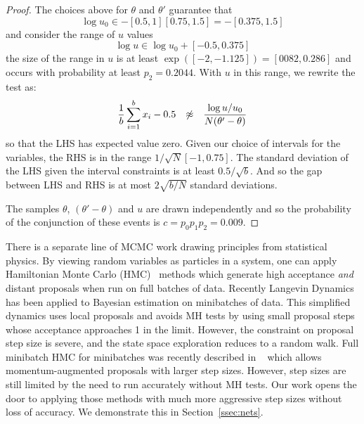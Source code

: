 \documentclass{article}
\begin{document}
\begin{proof}
 The choices above for $\theta$ and $\theta'$ guarantee that
  \begin{equation}
    \log u_0 \in -[0.5,1][0.75,1.5] = -[0.375,1.5]
        \end{equation}
and consider the range of $u$ values
  \begin{equation}
    \log u \in \log u_0 + [-0.5,0.375]
  \end{equation}
  the size of the range in $u$ is at least $\exp([-2,-1.125]) = [0082,0.286]$ and occurs
  with probability at least $p_2=0.2044$. With $u$ in this range, we rewrite the test as:
  \begin{equation}
    \frac{1}{b}\sum_{i=1}^b x_i-0.5 \hspace{0.1in} \not\approx \hspace{0.1in} \frac{\log u/u_0}{N(\theta'-\theta)}
  \end{equation}
  so that the LHS has expected value zero.  Given our choice of intervals for the variables, the RHS is in the range $1/\sqrt{N}[-1,0.75]$.
  The standard deviation of the LHS given the interval constraints is at least $0.5/\sqrt{b}$. And
  so the gap between LHS and RHS is at most $2\sqrt{b/N}$ standard deviations. 


  The samples $\theta$, $(\theta'-\theta)$
  and $u$ are drawn independently and so the probability of the conjunction of these events is
  $c = p_0 p_1 p_2 = 0.009$.
\end{proof}
There is a separate line of MCMC work drawing principles from
statistical physics. By viewing random variables as particles in a
system, one can apply Hamiltonian Monte Carlo
(HMC)~\cite{mcmc_hamiltonian_2010} methods which generate high
acceptance \emph{and} distant proposals when run on full batches of
data. Recently Langevin
Dynamics~\cite{langevin_2011,conf/icml/AhnBW12} has been applied to
Bayesian estimation on minibatches of data. This simplified dynamics
uses local proposals and avoids MH tests by using small proposal steps
whose acceptance approaches 1 in the limit. However, the constraint on
proposal step size is severe, and the state space exploration reduces
to a random walk. Full minibatch HMC for minibatches was recently
described in ~\cite{sghmc_2014} which allows momentum-augmented
proposals with larger step sizes. However, step sizes are still
limited by the need to run accurately without MH tests.
Our work opens the door to applying those methods with much
more aggressive step sizes without loss of accuracy. We demonstrate
this in Section~\ref{ssec:nets}.
\end{document}
